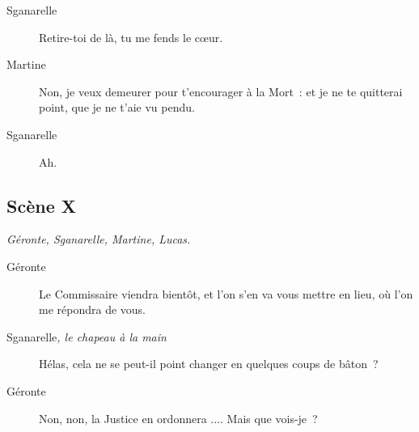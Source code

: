 \documentclass[french,twoside]{book} %
\begin{document}
 \begin{description} \item[Sganarelle] 

Retire-toi de là, tu me fends le cœur.\end{description}
 \begin{description} \item[Martine] 

Non, je veux demeurer pour t’encourager à la Mort : et je ne te quitterai point, que je ne t’aie vu pendu.\end{description}
 \begin{description} \item[Sganarelle] 

Ah.\end{description}
\subsection[{Scène X}]{Scène X}
\label{III10}
\textit{Géronte, Sganarelle, Martine, Lucas.}\par
 \begin{description} \item[Géronte] 

Le Commissaire viendra bientôt, et l’on s’en va vous mettre en lieu, où l’on me répondra de vous.\end{description}
 \begin{description} \item[Sganarelle\textit{, le chapeau à la main}\par
] 

Hélas, cela ne se peut-il point changer en quelques coups de bâton ?\end{description}
 \begin{description} \item[Géronte] 

Non, non, la Justice en ordonnera .... Mais que vois-je ?\end{description}
\end{document}
